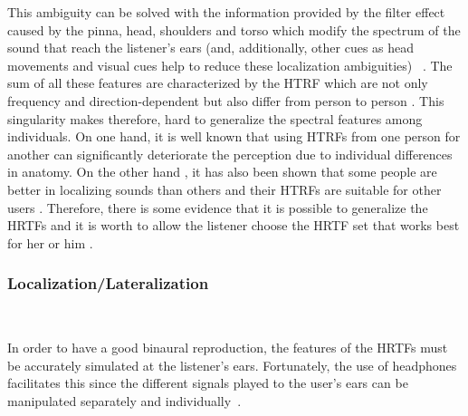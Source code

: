 \documentclass[journal]{IEEEtran}
\begin{document}
This ambiguity can be solved with the information provided by the filter effect caused by the pinna, head, shoulders and torso which modify the spectrum of the sound that reach the listener's ears (and, additionally, other cues as head movements and visual cues help to reduce these localization ambiguities) ~\cite{SpatialAudio2007}. The sum of all these features are characterized by the HTRF which are not only frequency and direction-dependent but also differ from person to person \cite{Rumsey2001}. This singularity makes therefore, hard to generalize the spectral features among individuals. On one hand, it is well known that using HTRFs from one person for another can significantly deteriorate the perception due to individual differences in anatomy. On the other hand , it has also been shown that some people are better in localizing sounds than others and their HTRFs are suitable for other users \cite{SpatialAudio2007}. Therefore, there is some evidence that it is possible to generalize the HRTFs and it is worth to allow the listener choose the HRTF set that works best for her or him \cite{Tame2012}.\\

 

\subsubsection*{Localization/Lateralization}~

In order to have a good binaural reproduction, the features of the HRTFs must be accurately simulated at the listener's ears. Fortunately, the use of headphones facilitates this since the different signals played to the user's ears can be manipulated separately and individually~\cite{plenge1972}.
\end{document}
